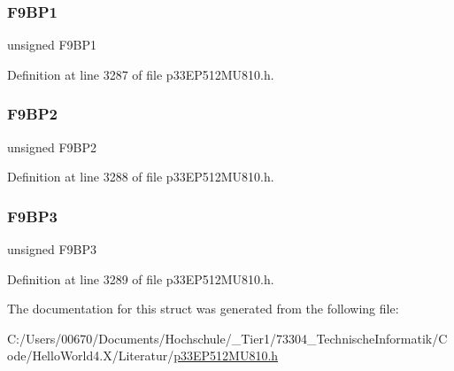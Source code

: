 \subsubsection{\texorpdfstring{F9\+B\+P1}{F9BP1}}
{\footnotesize\ttfamily unsigned F9\+B\+P1}



Definition at line 3287 of file p33\+E\+P512\+M\+U810.\+h.

\mbox{\label{structtag_c1_b_u_f_p_n_t3_b_i_t_s_a5c10af0ab5f0f9eb1e07746455e5987b}} 
\subsubsection{\texorpdfstring{F9\+B\+P2}{F9BP2}}
{\footnotesize\ttfamily unsigned F9\+B\+P2}



Definition at line 3288 of file p33\+E\+P512\+M\+U810.\+h.

\mbox{\label{structtag_c1_b_u_f_p_n_t3_b_i_t_s_a7263710482a0ec8923783f6900197e3d}} 
\subsubsection{\texorpdfstring{F9\+B\+P3}{F9BP3}}
{\footnotesize\ttfamily unsigned F9\+B\+P3}



Definition at line 3289 of file p33\+E\+P512\+M\+U810.\+h.



The documentation for this struct was generated from the following file\+:\begin{DoxyCompactItemize}
\item 
C\+:/\+Users/00670/\+Documents/\+Hochschule/\+\_\+\+Tier1/73304\+\_\+\+Technische\+Informatik/\+Code/\+Hello\+World4.\+X/\+Literatur/\hyperlink{p33_e_p512_m_u810_8h}{p33\+E\+P512\+M\+U810.\+h}\end{DoxyCompactItemize}
